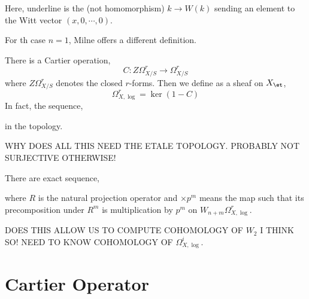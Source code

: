 \documentclass[12pt]{article}
\begin{document}
\begin{rmk}
Here, underline is the (not homomorphism) $k \to W(k)$ sending an element to the Witt vector $(x, 0, \cdots, 0)$.
\end{rmk}

\begin{rmk}
For th case $n = 1$, Milne offers a different definition. 
\end{rmk}

There is a Cartier operation,
\[ C : Z \Omega^r_{X/S} \to \Omega^r_{X/S} \]
where $Z \Omega^r_{X/S}$ denotes the closed $r$-forms. Then we define as a sheaf on $X_{\et}$,
\[ \Omega^r_{X, \log} = \ker{(1 - C)} \]
In fact, the sequence,
\begin{center}
\end{center}
in the \etale topology. 

\begin{rmk}
WHY DOES ALL THIS NEED THE ETALE TOPOLOGY. PROBABLY NOT SURJECTIVE OTHERWISE!
\end{rmk}

\begin{prop}
There are exact sequence,
\begin{center}
\end{center}
where $R$ is the natural projection operator and $\times p^m$ means the map such that its precomposition under $R^m$ is multiplication by $p^m$ on $W_{n+m} \Omega^r_{X, \log}$.
\end{prop}

DOES THIS ALLOW US TO COMPUTE COHOMOLOGY OF $W_2$ I THINK SO! NEED TO KNOW COHOMOLOGY OF $\Omega^i_{X, \log}$.

\section{Cartier Operator}

\end{document}
